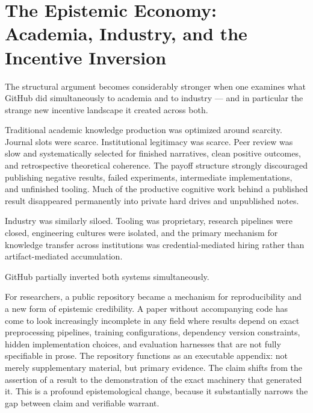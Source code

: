 \documentclass[11pt]{article}
\begin{document}
\section{The Epistemic Economy: Academia, Industry, and the Incentive Inversion}

The structural argument becomes considerably stronger when one examines what
GitHub did simultaneously to academia and to industry --- and in particular the
strange new incentive landscape it created across both.

Traditional academic knowledge production was optimized around scarcity.
Journal slots were scarce. Institutional legitimacy was scarce. Peer review
was slow and systematically selected for finished narratives, clean positive
outcomes, and retrospective theoretical coherence. The payoff structure strongly
discouraged publishing negative results, failed experiments, intermediate
implementations, and unfinished tooling. Much of the productive cognitive work
behind a published result disappeared permanently into private hard drives and
unpublished notes.

Industry was similarly siloed. Tooling was proprietary, research pipelines were
closed, engineering cultures were isolated, and the primary mechanism for
knowledge transfer across institutions was credential-mediated hiring rather than
artifact-mediated accumulation.

GitHub partially inverted both systems simultaneously.

For researchers, a public repository became a mechanism for reproducibility and
a new form of epistemic credibility. A paper without accompanying code has come
to look increasingly incomplete in any field where results depend on exact
preprocessing pipelines, training configurations, dependency version constraints,
hidden implementation choices, and evaluation harnesses that are not fully
specifiable in prose. The repository functions as an executable appendix: not
merely supplementary material, but primary evidence. The claim shifts from the
assertion of a result to the demonstration of the exact machinery that generated
it. This is a profound epistemological change, because it substantially narrows
the gap between claim and verifiable warrant.
\end{document}
